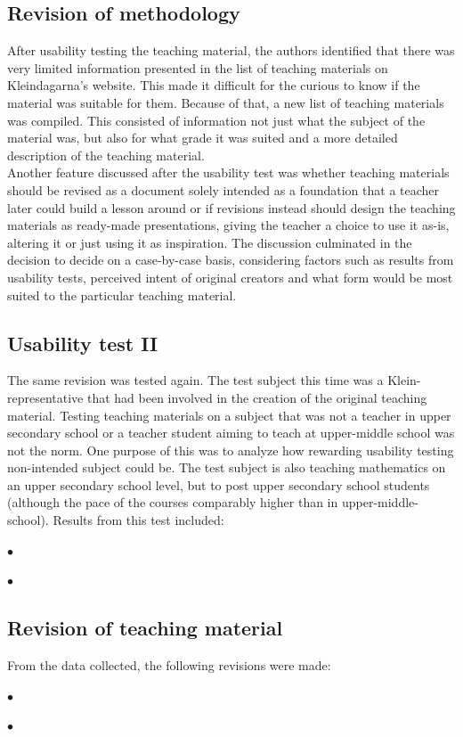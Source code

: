 \subsection{Revision of methodology}
After usability testing the teaching material, the authors identified that there was very limited information presented in the list of teaching materials on Kleindagarna's website. This made it difficult for the curious to know if the material was suitable for them. Because of that, a new list of teaching materials was compiled. This consisted of information not just what the subject of the material was, but also for what grade it was suited and a more detailed description of the teaching material.\\
Another feature discussed after the usability test was whether teaching materials should be revised as a document solely intended as a foundation that a teacher later could build a lesson around or if revisions instead should design the teaching materials as ready-made presentations, giving the teacher a choice to use it as-is, altering it or just using it as inspiration. The discussion culminated in the decision to decide on a case-by-case basis, considering factors such as results from usability tests, perceived intent of original creators and what form would be most suited to the particular teaching material.
\subsection{Usability test II}
The same revision was tested again. The test subject this time was a Klein-representative that had been involved in the creation of the original teaching material. Testing teaching materials on a subject that was not a teacher in upper secondary school or a teacher student aiming to teach at upper-middle school was not the norm. One purpose of this was to analyze how rewarding usability testing non-intended subject could be. The test subject is also teaching mathematics on an upper secondary school level, but to post upper secondary school students (although the pace of the courses comparably higher than in upper-middle-school). Results from this test included:
\begin{description}
    \item $\bullet$
    \item $\bullet$
\end{description}
\subsection{Revision of teaching material}
From the data collected, the following revisions were made:
\begin{description}
    \item $\bullet$
    \item $\bullet$
\end{description}
